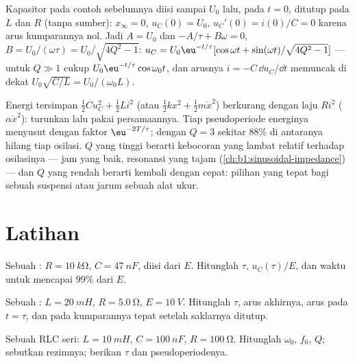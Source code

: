 \begin{example}\label{ex:b1:transient-regimes:ic}
Kapasitor pada contoh sebelumnya diisi sampai $U_0$ lalu, pada
$t = 0$, ditutup pada $L$ dan $R$ (tanpa sumber): $x_\infty = 0$,
$u_C(0) = U_0$, $u_C'(0) = i(0)/C = 0$ karena arus kumparannya nol.
Jadi $A = U_0$ dan $-A/\tau + B\omega = 0$, $B = U_0/(\omega\tau) =
U_0/\sqrt{4Q^2 - 1}$: $u_C = U_0\eu^{-t/\tau}[\cos\omega t + \sin(\omega
t)/\sqrt{4Q^2 - 1}]$ --- untuk $Q \gg 1$ cukup $U_0\eu^{-t/\tau}\cos\omega_0 t$,
dan arusnya $i = -C\,\dd u_C/\dd t$ memuncak di dekat $U_0\sqrt{C/L} =
U_0/(\omega_0 L)$.
\end{example}

\begin{remark}[Energi]\label{rem:b1:transient-regimes:energy}
Energi tersimpan $\tfrac12 Cu_C^2 + \tfrac12 Li^2$ (atau $\tfrac12 kx^2
+ \tfrac12 m\dot x^2$) berkurang dengan laju $Ri^2$ ($\alpha\dot x^2$):
turunkan lalu pakai persamaannya. Tiap pseudoperiode energinya menyusut
dengan faktor $\eu^{-2T/\tau}$; dengan $Q = 3$ sekitar $88\%$ di
antaranya hilang tiap osilasi. $Q$ yang tinggi berarti kebocoran yang
lambat relatif terhadap osilasinya --- jam yang baik, resonansi yang
tajam (\cref{ch:b1:sinusoidal-impedance}) --- dan $Q$ yang rendah
berarti kembali dengan cepat: pilihan yang tepat bagi sebuah suspensi
atau jarum sebuah alat ukur.
\end{remark}

\section{Latihan}

\begin{exercise}[$\star$]\label{exo:b1:transient-regimes:1}
Sebuah : $R = \qty{10}{k\ohm}$, $C = \qty{47}{nF}$, diisi
dari $E$. Hitunglah $\tau$, $u_C(\tau)/E$, dan waktu untuk mencapai $99\%$ dari $E$.
\end{exercise}

\begin{exercise}[$\star$]\label{exo:b1:transient-regimes:2}
Sebuah : $L = \qty{20}{mH}$, $R = \qty{5.0}{\ohm}$, $E = \qty{10}{V}$.
Hitunglah $\tau$, arus akhirnya, arus pada $t = \tau$, dan  pada
kumparannya tepat setelah saklarnya ditutup.
\end{exercise}

\begin{exercise}[$\star$]\label{exo:b1:transient-regimes:3}
Sebuah RLC seri: $L = \qty{10}{mH}$, $C = \qty{100}{nF}$, $R = \qty{100}{\ohm}$.
Hitunglah $\omega_0$, $f_0$, $Q$; sebutkan rezimnya; berikan $\tau$ dan
pseudoperiodenya.
\end{exercise}

